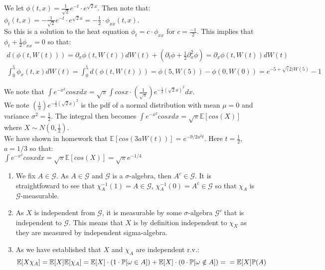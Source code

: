 \documentclass[12pt,twoside, letter]{exam}
\theoremstyle{definition}
\newcommand{\ee}{\mathbb{E}}
\newcommand{\pp}{\mathbb{P}}
\begin{document}
  \begin{solution}
    We let $\phi(t,x) = \frac{1}{\sqrt{2}} e^{-t}\cdot e^{\sqrt{2}x}$. Then note that: \\
      $\phi_{t}(t,x) = -\frac{1}{\sqrt{2}} e^{-t}\cdot e^{\sqrt{2}x} = -\frac{1}{2} \cdot \phi_{xx}(t,x)$. \\
      So this is a solution to the heat equation $\phi_{t} = c \cdot \phi_{xx}$ for $c = \frac{-1}{2}$. This
      implies that $\phi_{t} + \frac{1}{2}\phi_{xx} = 0$ so that: \\
      \begin{align*}
        d(\phi(t,W(t))) = \partial_x \phi(t,W(t))dW(t) + (\partial_t \phi +\frac{1}{2}\partial^2_{x} \phi) = \partial_x \phi(t,W(t))dW(t) \\
        \int^5_0 \phi_{x}(t,x) dW(t) = \int^5_0 d(\phi(t,W(t))) = \phi(5, W(5)) - \phi(0, W(0)) = e^{-5+\sqrt(2)W(5)} - 1
      \end{align*}
  \end{solution}

\begin{solution}
  We note that $\int e^{-x^2}cos x dx = \sqrt{\pi} \int cos x \cdot (\frac{1}{\sqrt{\pi}}) e^{-\frac{1}{2}(\sqrt{2}x)^2} dx$.\\
  We note $(\frac{1}{\pi}) e^{-\frac{1}{2}(\sqrt{2}x)^2}$ is the pdf of a normal distribution with mean $\mu = 0$ and variance $\sigma^2 = \frac{1}{2}$.
  The integral then becomes $\int e^{-x^2}cos x dx = \sqrt{\pi} \ee[cos(X)]$ where $X \sim N(0, \frac{1}{2})$. \\
  We have shown in homework that $\ee[cos(3aW(t))] = e^{-9/2a^2t}$. Here $t = \frac{1}{2}$, $a = 1/3$ so that: \\
  $\int e^{-x^2}cos x dx = \sqrt{\pi} \ee[cos(X)] = \sqrt{\pi} e^{-1/4}$
\end{solution}


\begin{solution}
  \begin{enumerate}
    \item We fix $A \in \mathcal{G}$. As $A \in \mathcal{G}$ and $\mathcal{G}$ is a $\sigma$-algebra, then $A^{c} \in \mathcal{G}$. It is straightfoward
      to see that $\chi_A^{-1}(1) = A \in \mathcal{G}$, $\chi_A^{-1}(0) = A^c \in \mathcal{G}$ so that $\chi_A$ is $\mathcal{G}$-measurable.
    \item As $X$ is independent from $\mathcal{G}$, it is measurable by some $\sigma$-algebra $\mathcal{G}'$ that is independent to $\mathcal{G}$.
      This means that $X$ is by definition independent to $\chi_X$ as they are measured by independent sigma-algebra.
    \item As we have established that $X$ and $\chi_A$ are independent r.v.:
      \begin{equation*}
        \ee[X \chi_A] = \ee[X]\ee[\chi_A] = \ee[X]\cdot(1 \cdot \pp[\omega \in A]) + \ee[X]\cdot(0 \cdot \pp[\omega \notin A]) = \\
        = \ee[X]\pp(A)
      \end{equation*}
  \end{enumerate}
\end{solution}
\end{document}
